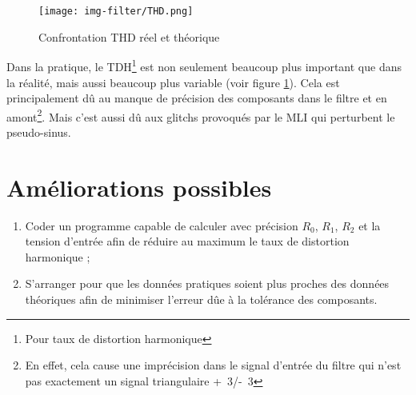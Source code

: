 \begin{figure}[ht]
	\centering
	\texttt{[image: img-filter/THD.png]}
	\caption{Confrontation THD réel et théorique}
	\label{fig:thd-filtre}
\end{figure}

Dans la pratique, le TDH\footnote{Pour taux de distortion harmonique} 
est non seulement beaucoup plus important que dans la réalité, mais aussi beaucoup plus 
variable (voir figure \ref{fig:thd-filtre}). Cela est principalement dû au manque de précision des composants dans le filtre
et en amont\footnote{En effet, cela cause une imprécision dans le signal d'entrée du filtre
qui n'est pas exactement un signal triangulaire \unit{+3}{\volt}/\unit{-3}{\volt}}. Mais c'est
aussi dû aux glitchs provoqués par le MLI qui perturbent le pseudo-sinus.

\section{Améliorations possibles}

\begin{enumerate}
	\item Coder un programme capable de calculer avec précision $R_0$, $R_1$, $R_2$ et la tension 
				d'entrée afin de réduire au maximum le taux de distortion harmonique ;
	\item S'arranger pour que les données pratiques soient plus proches des données théoriques afin 
				de minimiser l'erreur dûe à la tolérance des composants.
\end{enumerate}